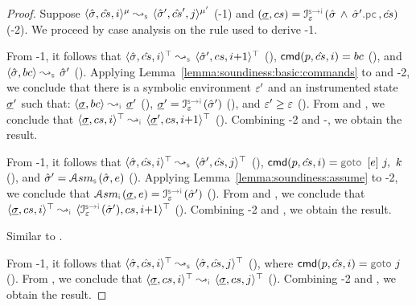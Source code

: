 \begin{proof}
Suppose $\abssemrule{\sstate, \scs, i}{\sstate', \scs', j}{\mode}{\mode'}{\symbolic}$ (\hyp{1}) and 
$(\istate, \cs) = \interpret{\symbinst}{\senv}(\sstate \, \wedge \, \sstate'.\pcsel, \scs)$ (\hyp{2}).
We proceed by case analysis on the rule used to derive \hyp{1}. 
\vspace{3pt}

\noindent {} 
From \hyp{1}, it follows that $\abssemrule{\sstate, \scs, i}{\sstate', \cs, i{+}1}{\top}{\top}{\symbolic}$ (), 
$\ccmd[\prog][\scs]{i} = \bcmd$ (), and $\absbsemrule{\sstate, \bcmd}{\sstate'}{\symbolic}$ (). 
Applying Lemma~\ref{lemma:soundiness:basic:commands} to  and \hyp{2}, we conclude that 
there is a symbolic environment $\varepsilon'$ and an instrumented state $\underline{\sigma}'$ such that: 
$\absbsemrule{\istate, \bcmd}{\istate'}{\instrumented}$ (), $\istate' = \interpret{\symbinst}{\senv}(\sstate')$ (), 
and $\varepsilon' \geq \varepsilon$ (). 
From  and , we conclude that $\abssemrule{\istate, \cs, i}{\istate', \cs, i{+}1}{\top}{\top}{\instrumented}$ (). 
 Combining \hyp{2} and -, we obtain the result.  
 \vspace{5pt}

\noindent {} 
From \hyp{1}, it follows that $\abssemrule{\sstate, \scs, i}{\sstate', \scs, j}{\top}{\top}{\symbolic}$ (), 
$\ccmd[\prog][\scs]{i} =  \ifgoto{\jsilexpr}{j}{k}$ (), and 
$ \sstate' = \absassume{\symbolic}(\sstate, \jsilexpr)$ (). 
Applying Lemma~\ref{lemma:soundiness:assume} to 
\hyp{2}, we conclude that 
$ \absassume{\instrumented}(\istate, \jsilexpr) = \interpret{\symbinst}{\senv}(\sstate')$ (). 
From  and , we conclude that $\abssemrule{\istate, \cs, i}{\interpret{\symbinst}{\senv}(\sstate'), \cs, i{+}1}{\top}{\top}{\instrumented}$ ().
Combining \hyp{2} and , we obtain the result.     
 \vspace{5pt}

\noindent {} Similar to . 
 \vspace{5pt}
 
\noindent {} From \hyp{1}, it follows that $\abssemrule{\sstate, \scs, i}{\sstate, \scs, j}{\top}{\top}{\symbolic}$ (),   
where $\ccmd[\prog][\scs]{i} = \goto \, j$ (). 
From , we conclude that 
$\abssemrule{\istate, \cs, i}{\istate, \cs, j}{\top}{\top}{\instrumented}$ ().
Combining \hyp{2} and , we obtain the result. 
 \vspace{3pt}
 

\end{proof}
